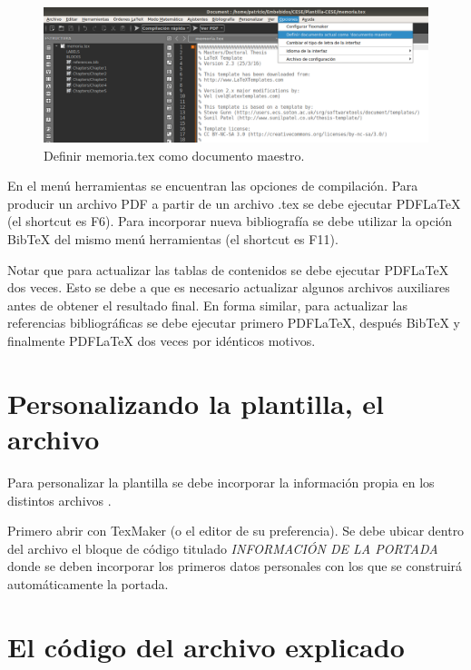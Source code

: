 \begin{figure}[h]
      \centering
      \includegraphics[width=\textwidth]{./Figures/docMaestro.png}
      \caption{Definir memoria.tex como documento maestro.}
      \label{fig:docMaestro}
\end{figure}

En el menú herramientas se encuentran las opciones de compilación. Para
producir un archivo PDF a partir de un archivo .tex se debe ejecutar PDFLaTeX
(el shortcut es F6). Para incorporar nueva bibliografía se debe utilizar la
opción BibTeX del mismo menú herramientas (el shortcut es F11).

Notar que para actualizar las tablas de contenidos se debe ejecutar PDFLaTeX
dos veces. Esto se debe a que es necesario actualizar algunos archivos
auxiliares antes de obtener el resultado final. En forma similar, para
actualizar las referencias bibliográficas se debe ejecutar primero PDFLaTeX,
después BibTeX y finalmente PDFLaTeX dos veces por idénticos motivos.

\section{Personalizando la plantilla, el archivo }
\label{sec:FillingFile}

Para personalizar la plantilla se debe incorporar la información propia en los
distintos archivos .

Primero abrir  con TexMaker (o el editor de su preferencia).
Se debe ubicar dentro del archivo el bloque de código titulado
\emph{INFORMACIÓN DE LA PORTADA} donde se deben incorporar los primeros datos
personales con los que se construirá automáticamente la portada.


\section{El código del archivo  explicado}

